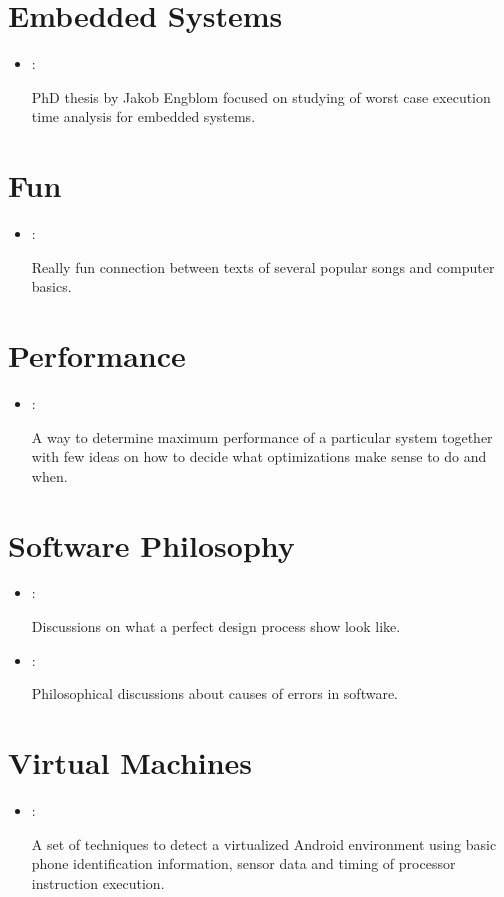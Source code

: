 \section*{Embedded Systems}
\begin{itemize}
    \item \cite{Engblom:WCET:2002}:

    PhD thesis by Jakob Engblom focused on studying of worst case execution time analysis for embedded systems.
\end{itemize}

\section*{Fun}
\begin{itemize}
    \item \cite{Colwell:Rock-N-Roll:2002}:

    Really fun connection between texts of several popular songs and computer basics.
\end{itemize}

\section*{Performance}
\begin{itemize}
    \item \cite{Williams:Roofline:2009}:

    A way to determine maximum performance of a particular system together with few ideas on how to decide what optimizations make sense to do and when.
\end{itemize}

\section*{Software Philosophy}
\begin{itemize}
    \item \cite{Parnas:Fake-It:1986}:

    Discussions on what a perfect design process show look like.

    \item \cite{Horner:Error-Rates:2019}:

    Philosophical discussions about causes of errors in software.
\end{itemize}

\section*{Virtual Machines}
\begin{itemize}
    \item \cite{Petsas:Android-VM-Detection:2014}:

    A set of techniques to detect a virtualized Android environment using basic phone identification information, sensor data and timing of processor instruction execution.
\end{itemize}


